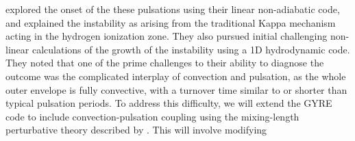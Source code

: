 \citet{1997AampA...327..224H} explored the onset of the these pulsations using
their linear non-adiabatic code, and explained the instability 
as arising from the traditional Kappa mechanism acting in the
hydrogen ionization zone. They also pursued initial challenging
non-linear calculations of the growth of the instability using a 1D 
hydrodynamic code. They noted that one of the prime challenges to
their ability to diagnose the outcome was the complicated interplay of
convection and pulsation, as the whole outer envelope is fully
convective, with a turnover time similar to or shorter than typical pulsation periods. To address this difficulty, we will extend the GYRE code to include convection-pulsation coupling using the mixing-length perturbative theory described by \citet{Grigahcene:2005}. This will involve modifying